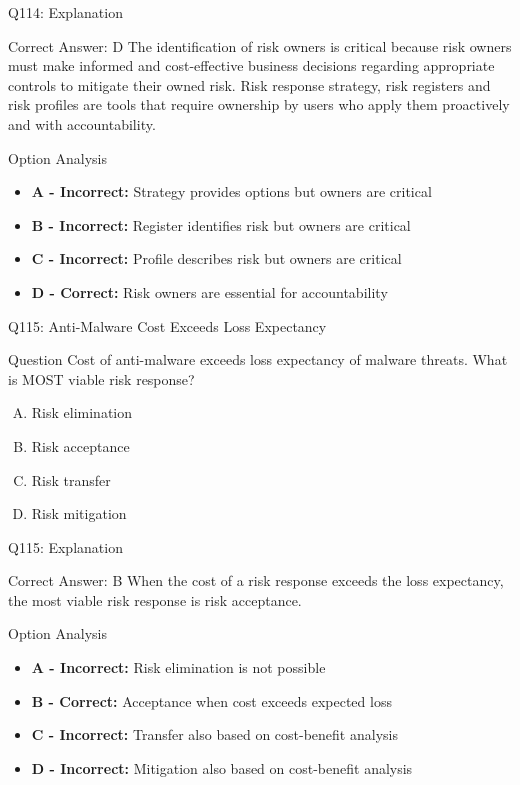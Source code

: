 \documentclass{beamer}
\begin{document}
	\begin{frame}{Q114: Explanation}
		\begin{block}{Correct Answer: D}
			The identification of risk owners is critical because risk owners must make informed and cost-effective business decisions regarding appropriate controls to mitigate their owned risk. Risk response strategy, risk registers and risk profiles are tools that require ownership by users who apply them proactively and with accountability.
		\end{block}
		\begin{block}{Option Analysis}
			\begin{itemize}
				\item \textbf{A - Incorrect:} Strategy provides options but owners are critical
				\item \textbf{B - Incorrect:} Register identifies risk but owners are critical
				\item \textbf{C - Incorrect:} Profile describes risk but owners are critical
				\item \textbf{D - Correct:} Risk owners are essential for accountability
			\end{itemize}
		\end{block}
	\end{frame}
	
	\begin{frame}{Q115: Anti-Malware Cost Exceeds Loss Expectancy}
		\begin{block}{Question}
			Cost of anti-malware exceeds loss expectancy of malware threats. What is MOST viable risk response?
		\end{block}
		\begin{enumerate}[(A)]
			\item Risk elimination
			\item Risk acceptance
			\item Risk transfer
			\item Risk mitigation
		\end{enumerate}
	\end{frame}
	
	\begin{frame}{Q115: Explanation}
		\begin{block}{Correct Answer: B}
			When the cost of a risk response exceeds the loss expectancy, the most viable risk response is risk acceptance.
		\end{block}
		\begin{block}{Option Analysis}
			\begin{itemize}
				\item \textbf{A - Incorrect:} Risk elimination is not possible
				\item \textbf{B - Correct:} Acceptance when cost exceeds expected loss
				\item \textbf{C - Incorrect:} Transfer also based on cost-benefit analysis
				\item \textbf{D - Incorrect:} Mitigation also based on cost-benefit analysis
			\end{itemize}
		\end{block}
	\end{frame}
	
\end{document}
